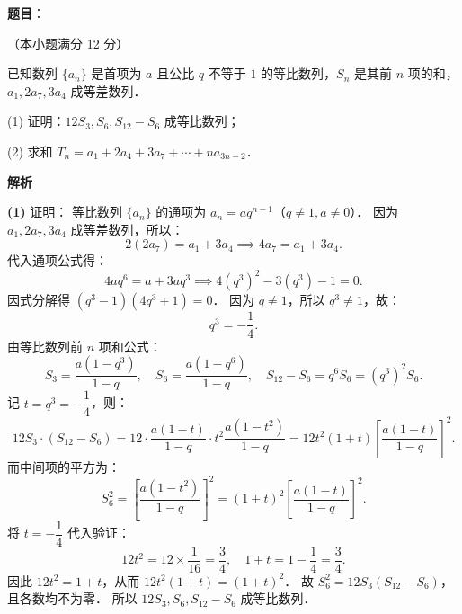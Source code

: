\begin{answer}

\textbf{题目}：

（本小题满分 12 分）

已知数列 $\{a_n\}$ 是首项为 $a$ 且公比 $q$ 不等于 $1$ 的等比数列，$S_n$ 是其前 $n$ 项的和，$a_1, 2a_7, 3a_4$ 成等差数列．

(1) 证明：$12S_3, S_6, S_{12} - S_6$ 成等比数列；

(2) 求和 $T_n = a_1 + 2a_4 + 3a_7 + \cdots + na_{3n-2}$．

\textbf{解析}

\textbf{(1)} 证明：
等比数列 $\{a_n\}$ 的通项为 $a_n = a q^{n-1}$（$q \neq 1, a \neq 0$）．
因为 $a_1, 2a_7, 3a_4$ 成等差数列，所以：
\nopagebreak[4]
\[
2(2a_7) = a_1 + 3a_4 \implies 4a_7 = a_1 + 3a_4.
\]
代入通项公式得：
\nopagebreak[4]
\[
4 a q^6 = a + 3 a q^3 \implies 4(q^3)^2 - 3(q^3) - 1 = 0.
\]
因式分解得 $(q^3 - 1)(4q^3 + 1) = 0$．
因为 $q \neq 1$，所以 $q^3 \neq 1$，故：
\nopagebreak[4]
\[
q^3 = -\frac{1}{4}.
\]
由等比数列前 $n$ 项和公式：
\nopagebreak[4]
\[
S_3 = \frac{a(1 - q^3)}{1 - q}, \quad S_6 = \frac{a(1 - q^6)}{1 - q}, \quad S_{12} - S_6 = q^6 S_6 = (q^3)^2 S_6.
\]
记 $t = q^3 = -\dfrac{1}{4}$，则：
\nopagebreak[4]
\[
12S_3 \cdot (S_{12} - S_6) = 12 \cdot \frac{a(1 - t)}{1 - q} \cdot t^2 \frac{a(1 - t^2)}{1 - q} = 12t^2 (1 + t) \left[\frac{a(1 - t)}{1 - q}\right]^2.
\]
而中间项的平方为：
\nopagebreak[4]
\[
S_6^2 = \left[\frac{a(1 - t^2)}{1 - q}\right]^2 = (1 + t)^2 \left[\frac{a(1 - t)}{1 - q}\right]^2.
\]
将 $t = -\dfrac{1}{4}$ 代入验证：
\nopagebreak[4]
\[
12t^2 = 12 \times \frac{1}{16} = \frac{3}{4}, \quad 1 + t = 1 - \frac{1}{4} = \frac{3}{4}.
\]
因此 $12t^2 = 1 + t$，从而 $12t^2(1 + t) = (1 + t)^2$．
故 $S_6^2 = 12S_3 (S_{12} - S_6)$，且各数均不为零．
所以 $12S_3, S_6, S_{12} - S_6$ 成等比数列．


\end{answer}
